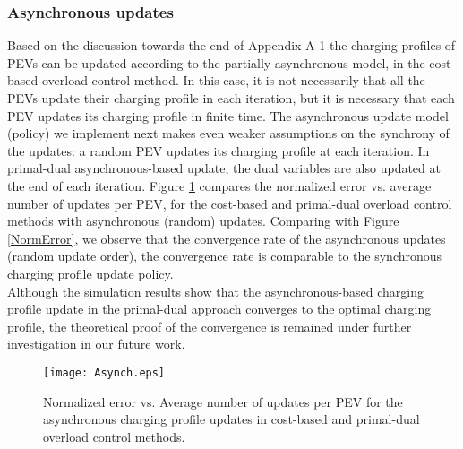 \documentclass[12pt,draftcls,onecolumn]{IEEEtran}
\begin{document}
\subsubsection{Asynchronous updates}
\indent Based on the discussion towards the end of Appendix A-1 the charging profiles of PEVs can be updated according to the partially asynchronous model, in the cost-based overload control method. In this case, it is not necessarily that all the PEVs update their charging profile in each iteration, but it is necessary that each PEV updates its charging profile in finite time. The asynchronous update model (policy) we implement next makes even weaker assumptions on the synchrony of the updates: a random PEV updates its charging profile at each iteration. In primal-dual asynchronous-based update, the dual variables are also updated at the end of each iteration. 
Figure \ref{Asynch} compares the normalized error vs. average number of updates per PEV, for the cost-based and primal-dual overload control methods with asynchronous (random) updates.  
Comparing with Figure \ref{NormError}, we observe that the convergence rate of the asynchronous updates (random update order), the convergence rate is comparable to the synchronous charging profile update policy.\\
\indent Although the simulation results show that the asynchronous-based charging profile update in the primal-dual approach converges to the optimal charging profile, the theoretical proof of the convergence is remained under further investigation in our future work.
\begin{figure}[H]
\centering
\texttt{[image: Asynch.eps]}
\caption{Normalized error vs. Average number of updates per PEV for the asynchronous charging profile updates in cost-based and primal-dual overload control methods.}
\label{Asynch}
\end{figure}
\end{document}
